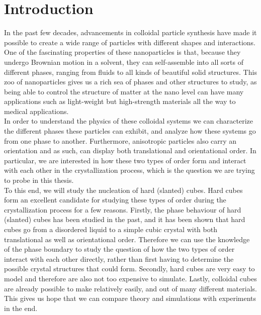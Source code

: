 \documentclass[thesis]{subfiles}
\begin{document}
\section{Introduction}

In the past few decades, advancements in colloidal particle synthesis have made it possible to create a wide range of particles with different shapes and interactions\cite{glotzer2007anisotropy}. One of the fascinating properties of these nanoparticles is that, because they undergo Brownian motion in a solvent, they can self-assemble into all sorts of different phases, ranging from fluids to all kinds of beautiful solid structures. This zoo of nanoparticles gives us a rich sea of phases and other structures to study, as being able to control the structure of matter at the nano level can have many applications such as  light-weight but high-strength materials all the way to medical applications.\\

In order to understand the physics of these colloidal systems we can characterize the different phases these particles can exhibit, and analyze how these systems go from one phase to another. Furthermore, anisotropic particles also carry an orientation and as such, can display both translational and orientational order. In particular, we are interested in how these two types of order form and interact with each other in the crystallization process, which is the question we are trying to probe in this thesis.\\

To this end, we will study the nucleation of hard (slanted) cubes. Hard cubes form an excellent candidate for studying these types of order during the crystallization process for a few reasons. Firstly, the phase behaviour of hard (slanted) cubes has been studied in the past\cite{van2017phase,smallenburg2012vacancy}, and it has been shown that hard cubes go from a disordered liquid to a simple cubic crystal with both translational as well as orientational order. Therefore we can use the knowledge of the phase boundary to study the question of how the two types of order interact with each other directly, rather than first having to determine the possible crystal structures that could form. Secondly, hard cubes are very easy to model and therefore are also not too expensive to simulate. Lastly, colloidal cubes are already possible to make relatively easily, and out of many different materials. This gives us hope that we can compare theory and simulations with experiments in the end.

\newpage
\end{document}
